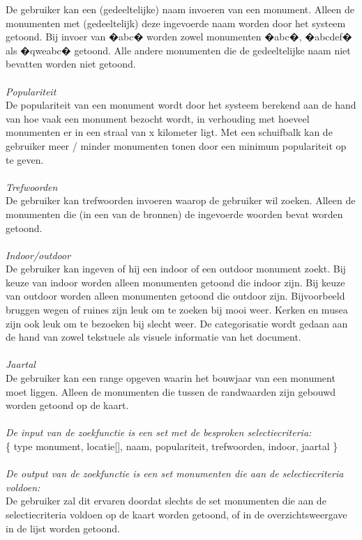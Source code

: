 \documentclass[a4paper,10pt]{article}
\begin{document}
			De gebruiker kan een (gedeeltelijke) naam invoeren van een monument. Alleen de monumenten met (gedeeltelijk) deze ingevoerde naam worden door het systeem getoond. Bij invoer van �abc� worden zowel monumenten �abc�, �abcdef� als �qweabc� getoond. Alle andere monumenten die de gedeeltelijke naam niet bevatten worden niet getoond.\\
			\\
			\textit{Populariteit}\\
			De populariteit van een monument wordt door het systeem berekend aan de hand van hoe vaak een monument bezocht wordt, in verhouding met hoeveel monumenten er in een straal van x kilometer ligt. Met een schuifbalk kan de gebruiker meer / minder monumenten tonen door een minimum populariteit op te geven.\\
			\\
			\textit{Trefwoorden}\\
			De gebruiker kan trefwoorden invoeren waarop de gebruiker wil zoeken. Alleen de monumenten die (in een van de bronnen) de ingevoerde woorden bevat worden getoond.\\
			\\
			\textit{Indoor/outdoor}\\
			De gebruiker kan ingeven of hij een indoor of een outdoor monument zoekt. Bij keuze van indoor worden alleen monumenten getoond die indoor zijn. Bij keuze van outdoor worden alleen monumenten getoond die outdoor zijn. Bijvoorbeeld bruggen wegen of ruines zijn leuk om te zoeken bij mooi weer. Kerken en musea zijn ook leuk om te bezoeken bij slecht weer. De categorisatie wordt gedaan aan de hand van zowel tekstuele als visuele informatie van het document.\\
			\\
			\textit{Jaartal}\\
			De gebruiker kan een range opgeven waarin het bouwjaar van een monument moet liggen. Alleen de monumenten die tussen de randwaarden zijn gebouwd worden getoond op de kaart.\\
			\\
			\textit{De input van de zoekfunctie is een set met de besproken selectiecriteria:}\\
			\{ type monument, locatie[], naam, populariteit, trefwoorden, indoor, jaartal \}\\
			\\
			\textit{De output van de zoekfunctie is een set monumenten die aan de selectiecriteria voldoen:}\\
			De gebruiker zal dit ervaren doordat slechts de set monumenten die aan de selectiecriteria voldoen op de kaart worden getoond, of in de overzichtsweergave in de lijst worden getoond.
\end{document}
